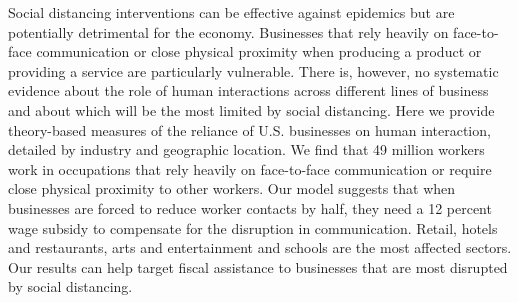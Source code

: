 Social distancing interventions can be effective against epidemics but are potentially detrimental for the economy.
Businesses that rely heavily on face-to-face communication or close physical proximity when producing a product or providing a service are particularly vulnerable. 
There is, however, no systematic evidence about the role of human interactions across different lines of business and about which will be the most limited by social distancing.
Here we provide theory-based measures of the reliance of U.S. businesses on human interaction, detailed by industry and geographic location.
We find that 49 million workers work in occupations that rely heavily on face-to-face communication or require close physical proximity to other workers. Our model suggests that when businesses are forced to reduce worker contacts by half, they need a 12 percent wage subsidy to compensate for the disruption in communication. Retail, hotels and restaurants, arts and entertainment and schools are the most affected sectors.
Our results can help target fiscal assistance to businesses that are most disrupted by social distancing.

